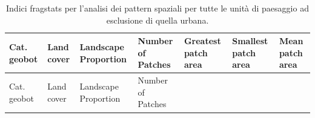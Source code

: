 \documentclass[
]{book}
\begin{document}
\begin{longtable}[]{@{}
  >{\raggedright\arraybackslash}p{}
  >{\raggedright\arraybackslash}p{}
  >{\centering\arraybackslash}p{}
  >{\raggedright\arraybackslash}p{}
  >{\raggedright\arraybackslash}p{}
  >{\raggedright\arraybackslash}p{}
  >{\raggedright\arraybackslash}p{}@{}}
\caption{\label{tab:noUrb} Indici fragstats per l'analisi dei pattern spaziali per tutte le unità di paesaggio ad esclusione di quella urbana.}\tabularnewline
\toprule\noalign{}
\begin{minipage}[b]{\linewidth}\raggedright
Cat. geobot
\end{minipage} & \begin{minipage}[b]{\linewidth}\raggedright
Land cover
\end{minipage} & \begin{minipage}[b]{\linewidth}\centering
Landscape Proportion
\end{minipage} & \begin{minipage}[b]{\linewidth}\raggedright
Number of Patches
\end{minipage} & \begin{minipage}[b]{\linewidth}\raggedright
Greatest patch area
\end{minipage} & \begin{minipage}[b]{\linewidth}\raggedright
Smallest patch area
\end{minipage} & \begin{minipage}[b]{\linewidth}\raggedright
Mean patch area
\end{minipage} \\
\midrule\noalign{}
\endfirsthead
\toprule\noalign{}
\begin{minipage}[b]{\linewidth}\raggedright
Cat. geobot
\end{minipage} & \begin{minipage}[b]{\linewidth}\raggedright
Land cover
\end{minipage} & \begin{minipage}[b]{\linewidth}\centering
Landscape Proportion
\end{minipage} & \begin{minipage}[b]{\linewidth}\raggedright
Number of Patches
\end{minipage} & \begin{minipage}[b]{\linewidth}\raggedright

\end{minipage}
\end{longtable}
\end{document}
